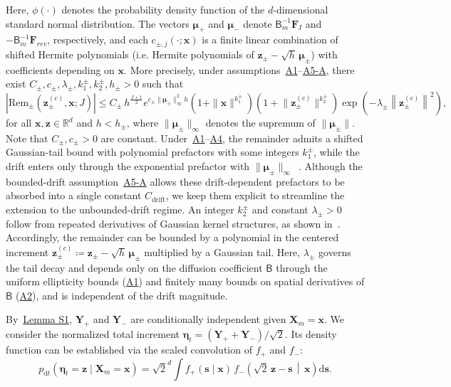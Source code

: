 \documentclass[
 longbibliography,
 twocolumn,
 superscriptaddress,
 amsmath,
 amssymb,
 amsthm,
 amsfonts,
 prl,
 floatfix,
]{revtex4-2}
\newcommand{\matbf}[1]{\boldsymbol{\mathsf{#1}}}
\begin{document}
\begin{widetext}
Here, $\phi(\cdot)$ denotes the probability density function of the $d$-dimensional standard normal distribution. The vectors $\bm\mu_+$ and $\bm\mu_-$ denote $\matbf{B}_m^{-1}\bm F_I$ and $-\matbf{B}_m^{-1}\bm F_{rev}$, respectively, and each $c_{\pm,j}(\cdot;\bm x)$ is a finite linear combination of shifted Hermite polynomials (i.e. Hermite polynomials of $\bm z_\pm-\sqrt h\,\bm\mu_\pm$) with coefficients depending on $\bm x$.
More precisely, under assumptions~\hyperlink{assumption:A1}{A1}--\hyperlink{assumption:A5-A}{A5-A}, there exist $C_\pm,c_\pm,\lambda_\pm,k^\pm_1,k^\pm_2,h_\pm>0$ such that
\begin{equation}
    \left|\mathrm{Rem}_\pm\!\!\left(\bm z_{\pm}^{(c)},\bm x;J\right)\right|
    \leq
    C_\pm\,h^{\frac{J+1}{2}}
    e^{c_\pm\|\bm\mu_\pm\|_\infty^2 h}
    \!\left(1+\|\bm x\|^{k^\pm_1}\right)
    \!\left(1+\big\|\bm z_{\pm}^{(c)}\big\|^{k^\pm_2}\right)
    \exp\!\left(-\lambda_\pm\!\left\|\bm z_{\pm}^{(c)}\right\|^2\right),
    \label{seq:f_remainder_bound}
\end{equation}
for all $\bm x,\bm z\in\mathbb R^d$ and $h<h_\pm$, where $\|\bm\mu_\pm\|_\infty$ denotes the supremum of $\|\bm\mu_\pm\|$.
Note that $C_\pm,c_\pm>0$ are constant. Under~\hyperlink{assumption:A1}{A1}--\hyperlink{assumption:A4}{A4}, the remainder admits a shifted Gaussian-tail bound with polynomial prefactors with some integers $k_1^\pm$, while the drift enters only through the exponential prefactor with $\|\bm\mu_\pm\|_\infty$~\cite{higa2013estimates,bally2015probabilistic}. 
Although the bounded-drift assumption~\hyperlink{assumption:A5-A}{A5-A} allows these drift-dependent prefactors to be absorbed into a single constant $C_{\mathrm{drift}}$, we keep them explicit to streamline the extension to the unbounded-drift regime.
An integer $k^\pm_2$ and constant $\lambda_\pm>0$ follow from repeated derivatives of Gaussian kernel structures, as shown in~\cite{yang2019anew,bally2015probabilistic}.
Accordingly, the remainder can be bounded by a polynomial in the centered increment $\bm z_\pm^{(c)}\coloneq\bm z_\pm-\sqrt h\,\bm\mu_\pm$ multiplied by a Gaussian tail.
Here, $\lambda_\pm$ governs the tail decay and depends only on the diffusion coefficient $\matbf B$ through the uniform ellipticity bounds (\hyperlink{assumption:A1}{A1}) and finitely many bounds on spatial derivatives of $\matbf B$ (\hyperlink{assumption:A2}{A2}), and is independent of the drift magnitude.

By~\hyperlink{lem:S1}{Lemma S1}, $\bm Y_+$ and $\bm Y_-$ are conditionally independent given $\bm{X}_m=\bm{x}$. We consider the normalized total increment $\bm\eta_t=(\bm Y_+ + \bm Y_-)/\sqrt{2}$.
Its density function can be established via the scaled convolution of $f_+$ and $f_-$: 
\begin{equation*}
    p_{\mathrm dt}(\bm\eta_t=\bm z \mid \bm X_m=\bm x)
    = \sqrt 2^d\!\!\int f_+(\bm s \mid \bm x)\, 
    f_-\!\!\left(\sqrt{2}\,\bm z - \bm s\,\middle|\, \bm x\right)\mathrm d\bm s.
\end{equation*}


\end{widetext}
\end{document}
